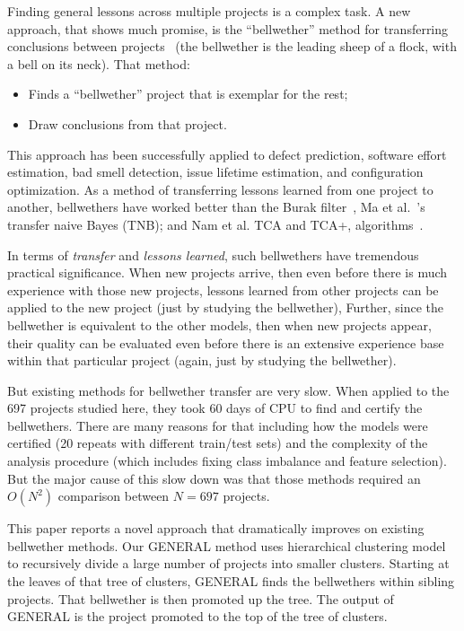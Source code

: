 \documentclass[10pt,journal,compsoc]{IEEEtran}
\newcommand{\bi}{\begin{itemize}}
\newcommand{\ei}{\end{itemize}}
\begin{document}
Finding general lessons across multiple projects is a complex task.
A new approach, that shows much promise,
is the ``bellwether'' method
 for   transferring conclusions between   projects~\cite{krishna2018bellwethers,krishna16a,mensah18z,mensah2017stratification,mensah2017investigating}  (the bellwether is the  leading sheep of a flock, with a bell on its neck).  That method:
\bi
\item Finds a  ``bellwether'' project that is exemplar for the rest;
\item Draw conclusions from  that project.
\ei
This approach has been successfully applied to defect prediction, software effort estimation, bad smell detection, issue lifetime estimation, and configuration optimization. As a 
method of transferring lessons learned from one project to another, bellwethers have worked better than the Burak filter~\cite{turhan09}, Ma et al.~\cite{Ma2012}'s transfer naive Bayes (TNB); and Nam et al.  TCA  and TCA+, algorithms~\cite{Nam13,Nam2015}.

In terms of {\em transfer} and {\em lessons learned},  such bellwethers have
  tremendous practical significance.  When new projects arrive, then even before there is much experience with those new projects,  lessons learned from other projects can be applied to the new project (just by studying the bellwether),
 Further, since the bellwether is equivalent to the other models,
 then when new projects appear, their quality can be evaluated even before there is an extensive experience base within that particular project (again, just by studying the bellwether).
 

But existing  methods for bellwether transfer are very slow. When applied to the 697 projects studied here, they took 60 days of CPU to find and certify the bellwethers. There are many reasons for that including how the models were certified (20 repeats  with different train/test sets)
and the complexity of the analysis procedure (which includes fixing class imbalance and feature selection). But the major cause of this slow down was that those   methods  required an $O(N^2)$ comparison between   $N=697$ projects.



This paper reports a novel approach  that dramatically improves on existing bellwether methods.
 Our GENERAL  method  uses hierarchical clustering model to recursively divide a large number of projects into smaller clusters. Starting at the leaves of that tree of clusters, GENERAL finds the    bellwethers within sibling projects. That bellwether is then promoted up the tree. The output of GENERAL is the project promoted to the top of the tree of clusters. 
 
\end{document}
